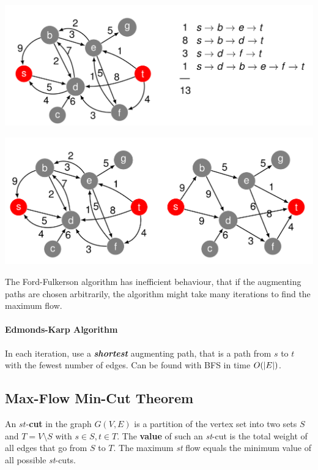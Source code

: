 \documentclass[11pt]{article}
\DeclarePairedDelimiter\abs{\lvert}{\rvert}
\begin{document}
\begin{center}
	\includegraphics[width=0.8\linewidth]{img/network_flow_ford_fulkerson_01}
\end{center}

\begin{center}
	\includegraphics[width=0.8\linewidth]{img/network_flow_ford_fulkerson_02}
\end{center}

The Ford-Fulkerson algorithm has inefficient behaviour, that if the augmenting paths are chosen arbitrarily, the algorithm might take many iterations to find the maximum flow.

\paragraph{Edmonds-Karp Algorithm} In each iteration, use a \textbf{\emph{shortest}} augmenting path, that is a path from $s$ to $t$ with the fewest number of edges. Can be found with BFS in time $O(\abs{E})$.

\subsection{Max-Flow Min-Cut Theorem}
\begin{theorem}
	An $st$-\textbf{cut} in the graph $G(V,E)$ is a partition of the vertex set into two sets $S$ and $T = V\setminus S$ with $s\in S, t\in T$. The \textbf{value} of such an \emph{st}-cut is the total weight of all edges that go from $S$ to $T$.  The maximum \emph{st} flow equals the minimum value of all possible \emph{st}-cuts.
\end{theorem}
\end{document}
